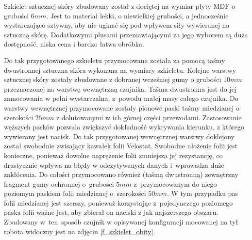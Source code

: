 Szkielet sztucznej skóry zbudowany został z dociętej na wymiar płyty MDF o grubości $6 mm$. Jest to materiał lekki, o niewielkiej grubości, a jednocześnie wystarczająco sztywny, aby nie uginać się pod wpływem siły wywieranej na sztuczną skórę. Dodatkowymi plusami przemawiającymi za jego wyborem są duża dostępność, niska cena i bardzo łatwa obróbka.


Do tak przygotowanego szkieletu przymocowana została za pomocą taśmy dwustronnej sztuczna skóra wykonana na wymiary szkieletu.
Kolejne warstwy sztucznej skóry zostały zbudowane z dobranej wcześniej gumy o grubości $10 mm$ przeznaczonej na warstwę wewnętrzną czujnika. Taśma dwustronna jest do jej zamocowania w pełni wystarczalna, z~powodu małej masy całego czujnika. Do warstwy wewnętrznej przymocowane zostały pionowe paski taśmy miedzianej o szerokości $25 mm$ z dolutowanymi w ich górnej części przewodami. Zastosowanie węższych pasków pozwala zwiększyć dokładność wykrywania kierunku, z którego wywierany jest nacisk. Do tak przygotowanej wewnętrznej warstwy doklejony został swobodnie zwisający kawałek folii Velostat. Swobodne ułożenie folii jest konieczne, ponieważ dowolne naprężenie folii zmniejsza jej rezystancję, co drastycznie wpływa na błędy w odczytywanych danych i~wprowadza duże zakłócenia. Do całości przymocowano również (taśmą dwustronną) zewnętrzny fragment gumy ochronnej o~grubości $5 mm$ z~przymocowanym do niego poziomym paskiem folii miedzianej o~szerokości $50 mm$. W tym przypadku pas folii miedzianej jest szerszy, ponieważ korzystając z~pojedynczego poziomego paska folii ważne jest, aby zbierał on  naciski z jak najszerszego obszaru. Zbudowany w~ten~sposób czujnik w opisywanej konfiguracji mocowanej na tył robota widoczny jest na zdjęciu \ref{f_szkielet_obity}.

